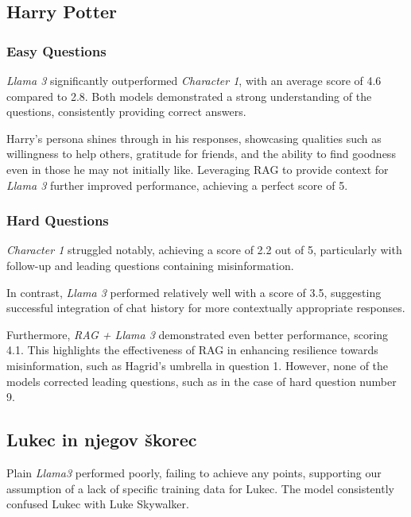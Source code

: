 \documentclass[fleqn,moreauthors,10pt]{ds_report}
\begin{document}
\subsection*{Harry Potter}

    \subsubsection*{Easy Questions}

    \textit{Llama 3} significantly outperformed \textit{Character 1}, with an average score of 4.6 compared to 2.8. Both models demonstrated a strong understanding of the questions, consistently providing correct answers.
    
    Harry's persona shines through in his responses, showcasing qualities such as willingness to help others, gratitude for friends, and the ability to find goodness even in those he may not initially like. Leveraging RAG to provide context for \textit{Llama 3} further improved performance, achieving a perfect score of 5.

    \subsubsection*{Hard Questions}

    \textit{Character 1} struggled notably, achieving a score of 2.2 out of 5, particularly with follow-up and leading questions containing misinformation.
    
    In contrast, \textit{Llama 3} performed relatively well with a score of 3.5, suggesting successful integration of chat history for more contextually appropriate responses.
    
    Furthermore, \textit{RAG + Llama 3} demonstrated even better performance, scoring 4.1. This highlights the effectiveness of RAG in enhancing resilience towards misinformation, such as Hagrid's umbrella in question 1. However, none of the models corrected leading questions, such as in the case of hard question number 9.
    
\subsection*{Lukec in njegov škorec}

Plain \textit{Llama3} performed poorly, failing to achieve any points, supporting our assumption of a lack of specific training data for Lukec. The model consistently confused Lukec with Luke Skywalker.
\end{document}
